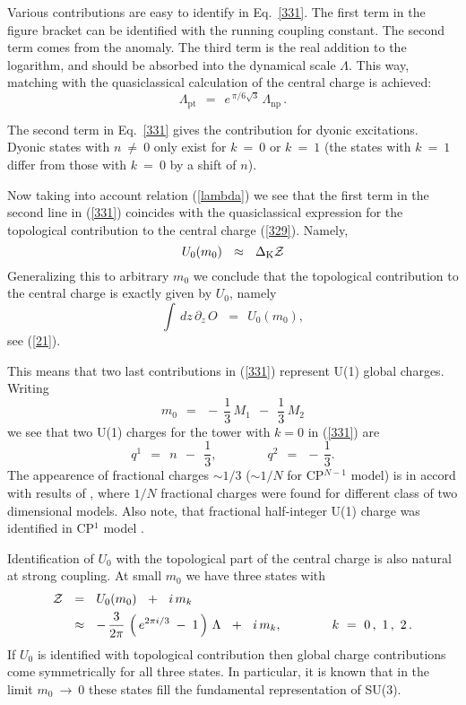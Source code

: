 \documentclass[epsfig,12pt]{article}
\def\beq{\begin{equation}}
\def\eeq{\end{equation}}
\def\beq{\begin{equation}}
\def\eeq{\end{equation}}
\newcommand{\p}{\partial}
\newcommand{\mc}[1]{\mathcal{#1}}
\begin{document}
	Various contributions are easy to identify in Eq.~\eqref{331}.
	The first term in the figure bracket can be identified with the running coupling constant.
	The second term comes from the anomaly.
	The third term is the real addition to the logarithm, and should be absorbed into the dynamical scale $ \Lambda $.
	This way, matching with the quasiclassical calculation of the central charge is achieved:
\beq
	\Lambda_\text{pt} ~~=~~ e^{\, \pi / 6 \sqrt{3}}\, \Lambda_\text{np}\,.
\label{lambda}
\eeq

	The second term in Eq.~\eqref{331} gives the contribution for dyonic excitations.
	Dyonic states with $ n ~ \neq~ 0 $ only exist for $ k ~=~ 0 $ or $ k ~=~ 1 $
	(the states with $ k ~=~ 1 $ differ from those with $ k ~=~ 0 $ by a shift of $ n $).

Now taking into account relation (\ref{lambda}) we see that  the first term in the second line in  (\ref{331})
coincides
with the quasiclassical expression for the topological contribution to the central charge (\ref{329}).
Namely,
\beq
	U_0(m_0) ~~\approx~~ \Delta_{\rm K}{\mathcal Z}
\label{UapproxT}
\eeq
Generalizing this to arbitrary $ m_0 $ we conclude that the topological contribution to the central charge is exactly given by $ U_0 $, namely
\beq
	\int\, dz\, \p_z\, O \, ~~=~~ U_0(m_0),
\label{U=T}
\eeq
see (\ref{21}).

This means that two last contributions in (\ref{331}) represent U(1) global charges.
Writing
\beq
	m_0  ~~=~~  -~ \frac13\, M_1  ~~-~~ \frac13\, M_2
\eeq
we see that two U(1) charges for the tower with $k=0$ in (\ref{331}) are
\beq
	q^1  ~~=~~  n  ~~-~~  \frac13, \qquad\qquad q^2 ~~=~~ -\,\frac13.
\label{qcharges}
\eeq
The appearence of fractional charges $ \sim 1/3 $ ($\sim 1/N$ for CP$^{N-1}$ model) is in accord with results of
\cite{FeIn}, where $ 1/N $ fractional charges were found for different class of two dimensional models.
Also note, that fractional half-integer U(1) charge was identified in CP$^1$ model \cite{SVZw}.

Identification of $ U_0 $ with the topological part of the central charge is also natural at strong coupling.
At small $ m_0 $ we have three states with
\begin{align}
%
	\mc{Z} &  ~~=~~ U_0(m_0)  ~~+~~ i\, m_k 
	\\
%
\notag
	& 
	~~\approx~~   -\, \frac{3}{2\pi}\, \left(\, e^{2 \pi i / 3 } \;-\; 1 \,\right) \, \Lambda
	~~+~~  i\,m_k, 
	\qquad\qquad 
	k~=~0\,,~1\,,~2\,.
\end{align}
If $ U_0 $ is identified with topological contribution then global charge contributions come symmetrically for all three states. 
In particular, it is known that in the limit $ m_0 ~\to~ 0 $ these states fill the fundamental representation of SU(3).
\end{document}
